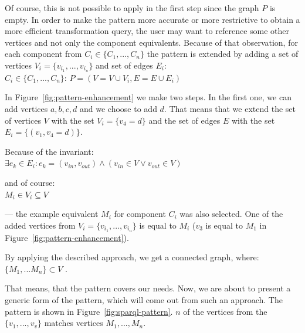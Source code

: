 Of course, this is not possible to apply in the first step since the graph $P$ is empty. 
In order to make the pattern more accurate or more restrictive to obtain a more 
efficient transformation query, the user may want to reference some other 
vertices and not only the component equivalents.
Because of that observation, for each component from $C_i \in \{C_1 ,..., C_n\}$ the pattern is 
extended by adding a set of vertices $V_i = \{v_{i_1}, ..., v_{i_u}\}$ and set of edges 
$E_i$:\\

{\centering \forall $C_i \in \{C_1 ,..., C_n\}$: $P = (V = V \cup V_i, E = E \cup E_i)$ \\[0.5cm]}

In Figure~\ref{fig:pattern-enhancement} we make two steps. In the first one, we 
can add vertices $a,b,c,d$ and we choose to add $d$. That means that we extend 
the set of vertices $V$ with the set $V_i = \{v_4 = d\}$ and the set of edges $E$ with 
the set $E_i = \{(v_1,v_4 = d)\}$.

Because of the invariant:\\

{\centering $\exists e_k \in E_i: e_k = (v_{in}, v_{out}) \land (v_{in} \in V \lor v_{out} \in V)$\\[0.5cm]}

and of course:\\

{\centering $M_i \in V_i \subseteq V$ \\[0.5cm]}

--- the example equivalent $M_i$ for component $C_i$ was also selected. One of the 
added vertices from $V_i = \{v_{i_1}, ..., v_{i_u}\}$ is equal to $M_i$ ($v_3$ is equal to $M_1$
in Figure~\ref{fig:pattern-enhancement}).
   
By applying the described approach, we get a connected graph, where:\\

{\centering $\{M_1, ... M_n\} \subset V$ .\\[0.5cm]}

That means, that the pattern covers our needs. Now, we are about to present
a generic form of the pattern, which will come out from 
such an approach. The pattern is shown in Figure~\ref{fig:sparql-pattern}. 
$n$ of the vertices from the $\{v_1, ..., v_v\}$ matches vertices $M_1, ..., M_n$.

